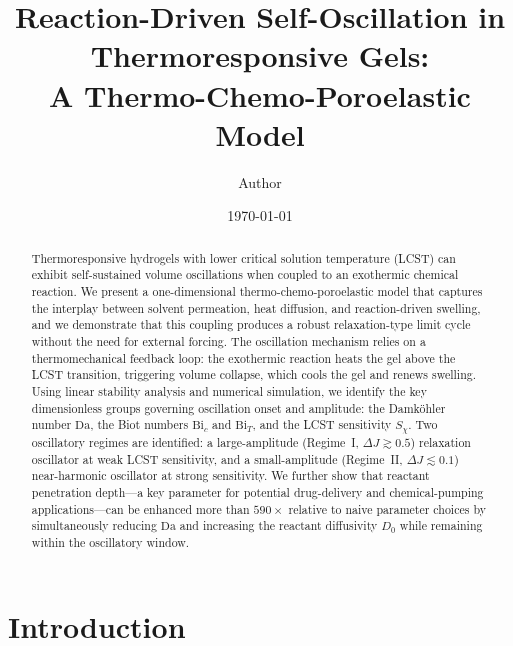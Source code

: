 \documentclass[aps,pre,reprint,superscriptaddress,longbibliography,floatfix]{revtex4-2}
\newcommand{\Da}{\mathrm{Da}}
\newcommand{\Bi}{\mathrm{Bi}}
\begin{document}
\title{Reaction-Driven Self-Oscillation in Thermoresponsive Gels: \\
A Thermo-Chemo-Poroelastic Model}

\author{Author}

\date{\today}

\begin{abstract}
Thermoresponsive hydrogels with lower critical solution temperature (LCST)
can exhibit self-sustained volume oscillations when coupled to an exothermic
chemical reaction. We present a one-dimensional thermo-chemo-poroelastic model
that captures the interplay between solvent permeation, heat diffusion, and
reaction-driven swelling, and we demonstrate that this coupling produces a
robust relaxation-type limit cycle without the need for external forcing. 
The oscillation mechanism relies on a thermomechanical feedback loop: the
exothermic reaction heats the gel above the LCST transition, triggering
volume collapse, which cools the gel and renews swelling. 
Using linear stability analysis and numerical simulation, we identify the
key dimensionless groups governing oscillation onset and amplitude: the
Damköhler number $\Da$, the Biot numbers $\Bi_c$ and $\Bi_T$, and the
LCST sensitivity $S_\chi$. 
Two oscillatory regimes are identified: a large-amplitude (Regime~I, $\Delta J\gtrsim 0.5$)
relaxation oscillator at weak LCST sensitivity, and a small-amplitude
(Regime~II, $\Delta J\lesssim 0.1$) near-harmonic oscillator at strong
sensitivity. We further show that reactant penetration depth—a key parameter
for potential drug-delivery and chemical-pumping applications—can be enhanced
more than $590\times$ relative to naive parameter choices by simultaneously
reducing $\Da$ and increasing the reactant diffusivity $D_0$ while remaining
within the oscillatory window.
\end{abstract}

\maketitle

\section{Introduction}
\label{sec:intro}
\end{document}
